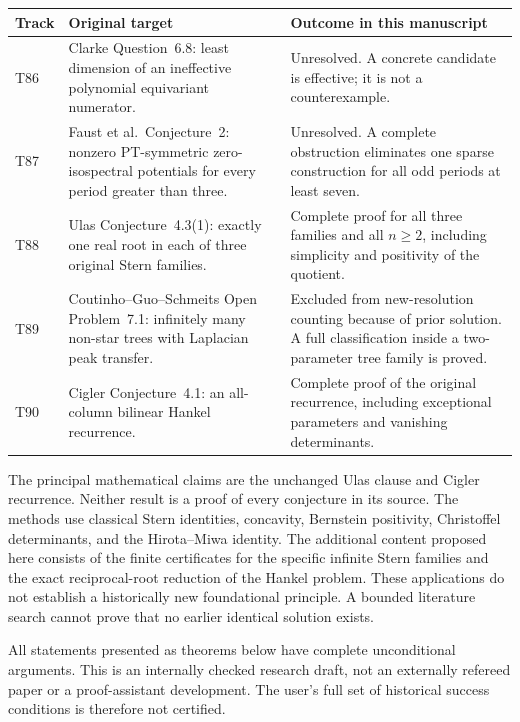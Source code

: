 \documentclass[11pt,a4paper]{article}
\theoremstyle{definition}\newtheorem{definition}[theorem]{Definition}
\theoremstyle{remark}\newtheorem{remark}[theorem]{Remark}
\begin{document}
\begin{center}\small
\begin{tabular}{@{}>{\raggedright\arraybackslash}p{}>{\raggedright\arraybackslash}p{}>{\raggedright\arraybackslash}p{}@{}}
\toprule
Track & Original target & Outcome in this manuscript \\
\midrule
T86 & Clarke Question~6.8: least dimension of an ineffective polynomial equivariant numerator. & Unresolved. A concrete candidate is effective; it is not a counterexample. \\
T87 & Faust et al.\ Conjecture~2: nonzero PT-symmetric zero-isospectral potentials for every period greater than three. & Unresolved. A complete obstruction eliminates one sparse construction for all odd periods at least seven. \\
T88 & Ulas Conjecture~4.3(1): exactly one real root in each of three original Stern families. & Complete proof for all three families and all $n\geq2$, including simplicity and positivity of the quotient. \\
T89 & Coutinho--Guo--Schmeits Open Problem~7.1: infinitely many non-star trees with Laplacian peak transfer. & Excluded from new-resolution counting because of prior solution. A full classification inside a two-parameter tree family is proved. \\
T90 & Cigler Conjecture~4.1: an all-column bilinear Hankel recurrence. & Complete proof of the original recurrence, including exceptional parameters and vanishing determinants. \\
\bottomrule
\end{tabular}
\end{center}

The principal mathematical claims are the unchanged Ulas clause and
Cigler recurrence. Neither result is a proof of every conjecture in its
source. The methods use classical Stern identities, concavity, Bernstein
positivity, Christoffel determinants, and the Hirota--Miwa identity.
The additional content proposed here consists of the finite certificates
for the specific infinite Stern families and the exact reciprocal-root
reduction of the Hankel problem. These applications do not establish a
historically new foundational principle. A bounded literature search
cannot prove that no earlier identical solution exists.

All statements presented as theorems below have complete unconditional
arguments. This is an internally checked research draft, not an externally
refereed paper or a proof-assistant development. The user's full set of
historical success conditions is therefore not certified.
\end{document}
